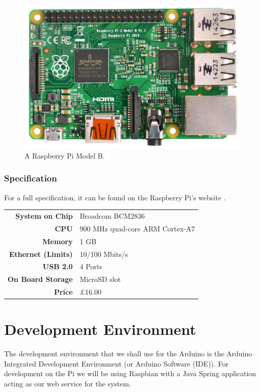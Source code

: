 \documentclass[12pt, a4paper]{article}
\begin{document}
\begin{figure}[H]
    \centering
    \includegraphics[scale = 0.05]{images/pi}
    \caption{A Raspberry Pi Model B.\cite{PiImage}}
    \label{fig:pi}
\end{figure}

\subsubsection{Specification}
For a full specification, it can be found on the Raspberry Pi's website
\cite{PiSpecs}.

\begin{tabular}{>{\bfseries}r l}
	System on Chip & Broadcom BCM2836 \\
	CPU & 900 MHz quad-core ARM Cortex-A7 \\
	Memory & 1 GB \\
	Ethernet (Limits) & 10/100 Mbits/s \\
	USB 2.0 & 4 Ports \\
	On Board Storage & MicroSD slot \\
	Price & £16.00 \\
\end{tabular}

\newpage


\section{Development Environment}
The development environment that we shall use for the Arduino is the Arduino
Integrated Development Environment (or Arduino Software (IDE)). For development
on the Pi we will be using Raspbian with a Java Spring application acting as our
web service for the system.
\end{document}
